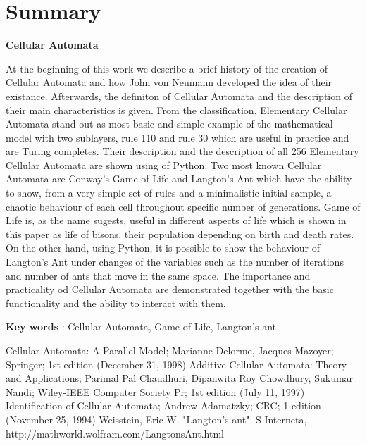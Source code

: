 \documentclass[11pt]{article}
\begin{document}
	 \section{Summary}\label{summary}
\begin{center} \textbf{Cellular Automata} \end{center}
At the beginning of this work we describe a brief history of the creation of Cellular Automata and how John von Neumann developed the idea of their existance. Afterwards, the definiton of Cellular Automata and the description of their main characteristics is given. From the classification, Elementary Cellular Automata stand out as most basic and simple example of the mathematical model with two sublayers, rule 110 and rule 30 which are useful in practice and are Turing completes. Their description and the description of all 256 Elementary Cellular Automata are shown using of Python.
Two most known Cellular Automata are Conway's Game of Life and Langton's Ant which have the ability to show, from a very simple set of rules and a minimalistic initial sample, a chaotic behaviour of each cell throughout specific number of generations. Game of Life is, as the name sugests, useful in different aspects of life which is shown in this paper as life of bisons, their population depending on birth and death rates. On the other hand, using Python, it is possible to show the behaviour of Langton's Ant under changes of the variables such as the number of iterations and number of ants that move in the same space.
The importance and practicality od Cellular Automata are demonstrated together with the basic functionality and the ability to interact with them.

 \vspace {5mm}
\textbf{Key words} : Cellular Automata, Game of Life, Langton's ant
\clearpage
\begin{thebibliography}{9}
 Cellular Automata: A Parallel Model; Marianne Delorme, Jacques Mazoyer; Springer; 1st edition (December 31, 1998)
 Additive Cellular Automata: Theory and Applications; Parimal Pal Chaudhuri, Dipanwita Roy Chowdhury, Sukumar Nandi; Wiley-IEEE Computer Society Pr; 1st edition (July 11, 1997)
 Identification of Cellular Automata; Andrew Adamatzky; CRC; 1 edition (November 25, 1994)
 Weisstein, Eric W. "Langton's ant". S Interneta, http://mathworld.wolfram.com/LangtonsAnt.html
\end{thebibliography}    
    
    
    
\end{document}
